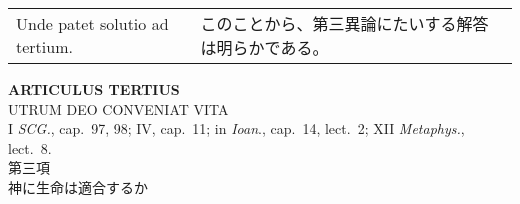 \documentclass[10pt]{jsarticle} %
\begin{document}
\begin{longtable}{p{21em}p{21em}}
\\






Unde patet solutio ad tertium.


&

このことから、第三異論にたいする解答は明らかである。





\end{longtable}
\newpage

\begin{center}
 {\Large {\bf ARTICULUS TERTIUS}}\\
 {\large UTRUM DEO CONVENIAT VITA}\\
 {\footnotesize I {\itshape SCG.}, cap.~97, 98; IV, cap.~11; in
 {\itshape Ioan}., cap.~14, lect.~2; XII {\itshape Metaphys.}, lect.~8.}\\
 {\Large 第三項\\神に生命は適合するか}
\end{center}
\end{document}
